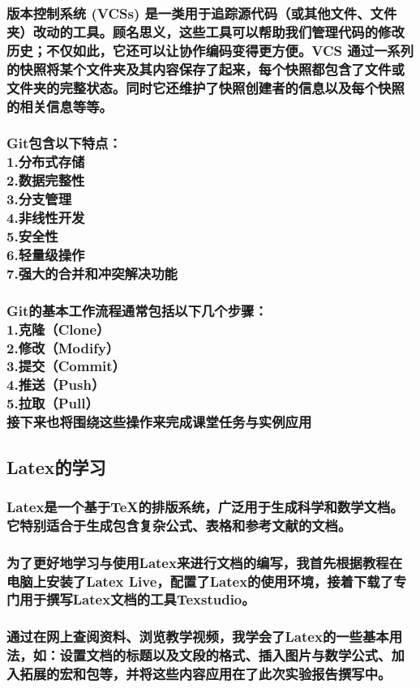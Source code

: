 \documentclass[UTF8,a4paper]{ctexart}
\begin{document}
\begin{sloppypar}
	\subsubsection{版本控制系统 (VCSs) 是一类用于追踪源代码（或其他文件、文件夹）改动的工具。顾名思义，这些工具可以帮助我们管理代码的修改历史；不仅如此，它还可以让协作编码变得更方便。VCS 通过一系列的快照将某个文件夹及其内容保存了起来，每个快照都包含了文件或文件夹的完整状态。同时它还维护了快照创建者的信息以及每个快照的相关信息等等。}
	\subsubsection{Git包含以下特点：\\1.分布式存储\\2.数据完整性\\3.分支管理\\4.非线性开发\\5.安全性\\6.轻量级操作\\7.强大的合并和冲突解决功能}
	\subsubsection{Git的基本工作流程通常包括以下几个步骤：\\1.克隆（Clone）\\2.修改（Modify）\\3.提交（Commit）\\4.推送（Push）\\5.拉取（Pull）\\接下来也将围绕这些操作来完成课堂任务与实例应用}
	\subsection{Latex的学习}
	\subsubsection{Latex是一个基于TeX的排版系统，广泛用于生成科学和数学文档。它特别适合于生成包含复杂公式、表格和参考文献的文档。}
	\subsubsection{为了更好地学习与使用Latex来进行文档的编写，我首先根据教程在电脑上安装了Latex Live，配置了Latex的使用环境，接着下载了专门用于撰写Latex文档的工具Texstudio。}
	\subsubsection{通过在网上查阅资料、浏览教学视频，我学会了Latex的一些基本用法，如：设置文档的标题以及文段的格式、插入图片与数学公式、加入拓展的宏和包等，并将这些内容应用在了此次实验报告撰写中。}

\end{sloppypar}
\end{document}
